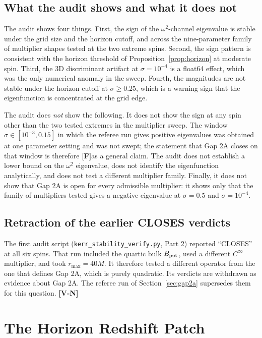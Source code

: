 \documentclass[11pt, a4paper]{article}
\newcommand{\VN}{\textcolor{vn}{\textbf{[V-N]}}}
\newcommand{\FF}{\textcolor{ff}{\textbf{[F]}}}
\theoremstyle{remark}
\theoremstyle{definition}
\begin{document}
\subsection{What the audit shows and what it does not}

The audit shows four things. First, the sign of the $\omega^2$-channel eigenvalue is stable under the grid size and the horizon cutoff, and across the nine-parameter family of multiplier shapes tested at the two extreme spins. Second, the sign pattern is consistent with the horizon threshold of Proposition~\ref{prop:horizon} at moderate spin. Third, the 3D discriminant artifact at $\sigma=10^{-4}$ is a float64 effect, which was the only numerical anomaly in the sweep. Fourth, the magnitudes are not stable under the horizon cutoff at $\sigma\ge 0.25$, which is a warning sign that the eigenfunction is concentrated at the grid edge.

The audit does \emph{not} show the following. It does not show the sign at any spin other than the two tested extremes in the multiplier sweep. The window $\sigma\in[10^{-3},0.15]$ in which the referee run gives positive eigenvalues was obtained at one parameter setting and was not swept; the statement that Gap 2A closes on that window is therefore \FF as a general claim. The audit does not establish a lower bound on the $\omega^2$ eigenvalue, does not identify the eigenfunction analytically, and does not test a different multiplier family. Finally, it does not show that Gap 2A is open for every admissible multiplier: it shows only that the family of multipliers tested gives a negative eigenvalue at $\sigma = 0.5$ and $\sigma = 10^{-4}$.

\subsection{Retraction of the earlier CLOSES verdicts}
\label{sec:retract}

The first audit script (\texttt{kerr\_stability\_verify.py}, Part 2) reported ``CLOSES'' at all six spins. That run included the quartic bulk $B_{\rm pot}$, used a different $C^\infty$ multiplier, and took $r_{\max} = 40M$. It therefore tested a different operator from the one that defines Gap 2A, which is purely quadratic. Its verdicts are withdrawn as evidence about Gap 2A. The referee run of Section~\ref{sec:gap2a} supersedes them for this question. \VN

\section{The Horizon Redshift Patch}
\label{sec:redshift}
\end{document}
